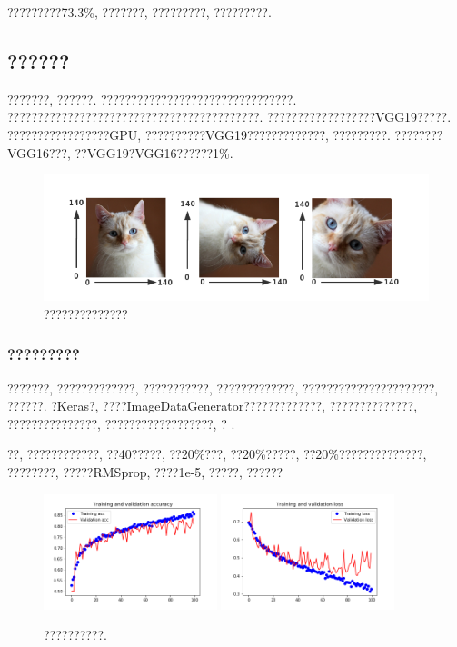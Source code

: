 \documentclass[lang=cn,11pt]{elegantpaper}
\begin{document}
?????????73.3\%, ???????, ?????????, ?????????. 
\subsection{??????}

???????, ??????. ????????????????????????????????. ??????????????????????????????????????????. ??????????????????VGG19?????. ?????????????????GPU, ??????????VGG19?????????????, ?????????. ????????VGG16???, ??VGG19?VGG16??????1\%. 
\begin{figure}[htbp]
	\centering
	  \includegraphics{aug.png}
	  \caption{??????????????\label{fig:augcat}}
	\end{figure}
\subsubsection{?????????}

???????, ?????????????, ???????????, ?????????????, ??????????????????????, ??????.  ?Keras?, ????ImageDataGenerator?????????????, ??????????????, ???????????????, ??????????????????, ? .

??, ????????????, ??40?????, ??20\%???, ??20\%?????, ??20\%??????????????, ????????, ?????RMSprop, ????1e-5, ?????, ??????
\begin{figure}[htbp]
	\centering
	  \includegraphics[width=0.45\textwidth]{small_aug_1.png}
	  \includegraphics[width=0.45\textwidth]{small_aug_2.png}
	  \caption{??????????.}
	\end{figure}
\end{document}
